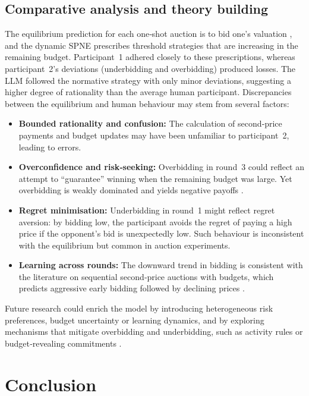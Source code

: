 \subsection{Comparative analysis and theory building}
The equilibrium prediction for each one‑shot auction is to bid one’s valuation \parencite{SpirakisAuctionsSlides}, and the dynamic SPNE prescribes threshold strategies that are increasing in the remaining budget.  Participant~1 adhered closely to these prescriptions, whereas participant~2’s deviations (underbidding and overbidding) produced losses.  The LLM followed the normative strategy with only minor deviations, suggesting a higher degree of rationality than the average human participant.  Discrepancies between the equilibrium and human behaviour may stem from several factors:
\begin{itemize}
    \item \textbf{Bounded rationality and confusion:} The calculation of second‑price payments and budget updates may have been unfamiliar to participant~2, leading to errors.
    \item \textbf{Overconfidence and risk‑seeking:} Overbidding in round~3 could reflect an attempt to ``guarantee'' winning when the remaining budget was large.  Yet overbidding is weakly dominated and yields negative payoffs \parencite{SpirakisAuctionsSlides}.
    \item \textbf{Regret minimisation:} Underbidding in round~1 might reflect regret aversion: by bidding low, the participant avoids the regret of paying a high price if the opponent’s bid is unexpectedly low.  Such behaviour is inconsistent with the equilibrium but common in auction experiments.
    \item \textbf{Learning across rounds:} The downward trend in bidding is consistent with the literature on sequential second‑price auctions with budgets, which predicts aggressive early bidding followed by declining prices \parencite{GhoshLiu2016}.
\end{itemize}
Future research could enrich the model by introducing heterogeneous risk preferences, budget uncertainty or learning dynamics, and by exploring mechanisms that mitigate overbidding and underbidding, such as activity rules or budget‑revealing commitments \parencite{ChenEtAl2023}.

\section{Conclusion}

